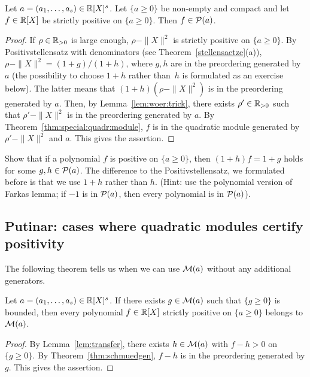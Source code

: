 \begin{theorem}
	\label{thm:schmuedgen}
	Let $a=(a_1,\ldots,a_s) \in \mathbb{R}[X]^s$. Let $\{a \ge 0\}$ be non-empty and compact and let $f \in \mathbb{R}[X]$ be strictly positive on $\{a \ge 0\}$. Then $f \in \mathcal{P}(a)$. 
\end{theorem}
\begin{proof}
	If $\rho \in \mathbb{R}_{>0}$ is large enough, $\rho - \|X\|^2$ is strictly positive on $\{a \ge 0\}$. By Positivstellensatz with denominators (see Theorem~\ref{stellensaetze}(a)), $\rho -\|X\|^2 = (1+g)/(1+h)$, where $g, h$ are in the preordering generated by $a$ (the possibility to choose $1+h$ rather than~$h$ is formulated as an exercise below). The latter means that $(1+h) (\rho - \|X\|^2)$ is in the preordering generated by $a$. Then, by Lemma~\ref{lem:woer:trick}, there exists $\rho' \in \mathbb{R}_{>0}$ such that $\rho' - \|X\|^2$ is in the preordering generated by $a$. By Theorem~\ref{thm:special:quadr:module}, $f$ is in the quadratic module generated by $\rho' - \|X\|^2$ and $a$. This gives the assertion.
\end{proof}

\begin{exercise}
	Show that if a polynomial $f$ is positive on $\{a \ge 0\}$, then $(1+h) f = 1+g$ holds for some $g,h \in \mathcal{P}(a)$. The difference to the Positivstellensatz, we formulated before is that we use $1+h$ rather than $h$. (Hint: use the polynomial version of Farkas lemma; if $-1$ is in $\mathcal{P}(a)$, then every polynomial is in $\mathcal{P}(a)$). 
\end{exercise} 

\subsection{Putinar: cases where quadratic modules certify positivity}

The following theorem tells us when we can use $\mathcal{M}(a)$ without any additional generators. 

\begin{theorem}[Putinar]
	Let $a=(a_1,\ldots,a_s) \in \mathbb{R}[X]^s$. If there exists $g \in \mathcal{M}(a)$ such that $\{g \ge 0\}$ is bounded, then every polynomial $f \in \mathbb{R}[X]$ strictly positive on $\{a \ge 0\}$ belongs to $\mathcal{M}(a)$. 
\end{theorem}
\begin{proof}
	By Lemma~\ref{lem:transfer}, there exists $h \in \mathcal{M}(a)$ with $f - h > 0$ on $\{g \ge 0\}$. By Theorem~\ref{thm:schmuedgen}, $f - h$ is in the preordering generated by $g$. This gives the assertion. 
\end{proof}


